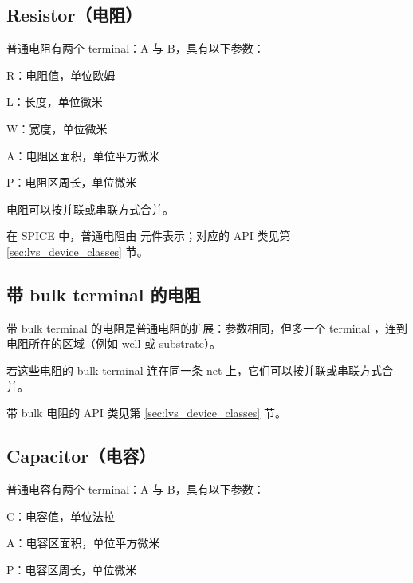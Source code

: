 \subsection{Resistor（电阻）}


普通电阻有两个 terminal：A 与 B，具有以下参数：

\begin{kldesc}
\item R：电阻值，单位欧姆
\item L：长度，单位微米
\item W：宽度，单位微米
\item A：电阻区面积，单位平方微米
\item P：电阻区周长，单位微米
\end{kldesc}

电阻可以按并联或串联方式合并。

在 SPICE 中，普通电阻由  元件表示；对应的 API 类见第 \ref{sec:lvs_device_classes} 节。

\subsection{带 bulk terminal 的电阻}


带 bulk terminal 的电阻是普通电阻的扩展：参数相同，但多一个 terminal ，连到电阻所在的区域（例如 well 或 substrate）。

若这些电阻的 bulk terminal 连在同一条 net 上，它们可以按并联或串联方式合并。

带 bulk 电阻的 API 类见第 \ref{sec:lvs_device_classes} 节。

\subsection{Capacitor（电容）}


普通电容有两个 terminal：A 与 B，具有以下参数：

\begin{kldesc}
\item C：电容值，单位法拉
\item A：电容区面积，单位平方微米
\item P：电容区周长，单位微米
\end{kldesc}

